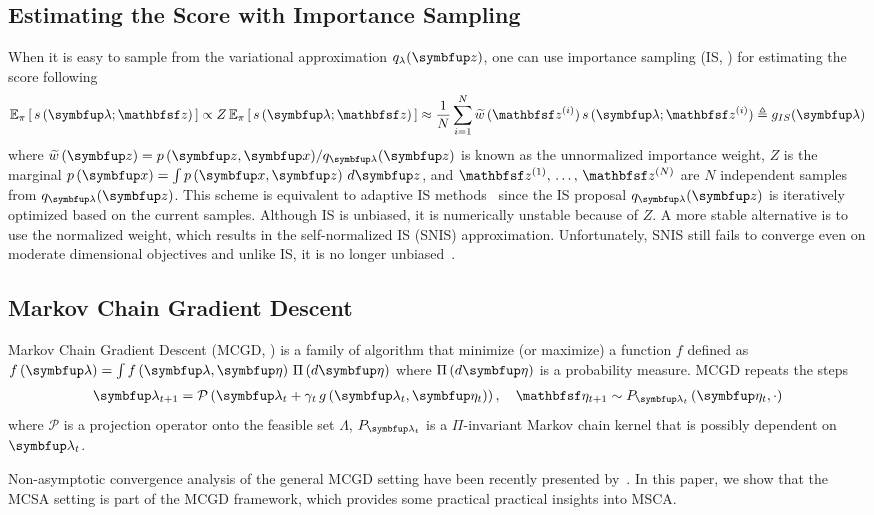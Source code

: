 \subsection{Estimating the Score with Importance Sampling}\label{section:is}
When it is easy to sample from the variational approximation \(q_{\lambda}(\vz)\), one can use importance sampling (IS, \citealt{robert_monte_2004}) for estimating the score following
\begin{align*}
  \Esub{\pi}{ s\,(\vlambda;\rvvz) } 
  \propto Z\,\Esub{\pi}{ s\,(\vlambda; \rvvz) } %
  \approx \frac{1}{N} \sum^{N}_{i=1} \widetilde{w}\,(\rvvz^{(i)}) \, s\,(\vlambda; \rvvz^{(i)}) 
  \triangleq g_{IS}(\vlambda)
\end{align*}
where \(\widetilde{w}\,(\vz) = p\,(\vz,\vx) / q_{\vlambda}(\vz)\) is known as the unnormalized importance weight, \(Z\) is the marginal \(p\left(\vx\right) = \int p\left(\vx, \vz\right) \, d\vz\), and \(\rvvz^{(1)},\, \ldots,\, \rvvz^{(N)}\) are \(N\) independent samples from \(q_{\vlambda}(\vz)\).
This scheme is equivalent to adaptive IS methods~\citep{bugallo_adaptive_2017} since the IS proposal \(q_{\vlambda}(\vz)\) is iteratively optimized based on the current samples.
Although IS is unbiased, it is numerically unstable because of \(Z\). %
A more stable alternative is to use the normalized weight, which results in the self-normalized IS (SNIS) approximation.
Unfortunately, SNIS still fails to converge even on moderate dimensional objectives and unlike IS, it is no longer unbiased~\citep{robert_monte_2004}.

\subsection{Markov Chain Gradient Descent}\label{section:mcgd}
Markov Chain Gradient Descent (MCGD, \citealt{duchi_ergodic_2012, NEURIPS2018_1371bcce}) is a family of algorithm that minimize (or maximize) a function \(f\) defined as \(f\left(\vlambda\right) = \int f\left(\vlambda, \veta\right) \, \Pi\left(d\veta\right)\) where \(\Pi\left(d\veta\right)\) is a probability measure.
MCGD repeats the steps 
\begin{align*}
  \vlambda_{t+1}    = \mathcal{P}\left( \vlambda_{t} + \gamma_t \, g\left(\vlambda_t, \veta_{t}\right)\right),\quad 
  \rvveta_{t+1}  \sim P_{\vlambda_{t}}\left( \veta_{t}, \cdot \right)
\end{align*}
where \(\mathcal{P}\) is a projection operator onto the feasible set \(\Lambda\), \(P_{\vlambda_{t}}\) is a \(\Pi\)-invariant Markov chain kernel that is possibly dependent on \(\vlambda_t\).

Non-asymptotic convergence analysis of the general MCGD setting have been recently presented by~\citet{duchi_ergodic_2012, pmlr-v99-karimi19a, doan_convergence_2020, Xiong_Xu_Liang_Zhang_2021}.
In this paper, we show that the MCSA setting is part of the MCGD framework, which provides some practical practical insights into MSCA.

